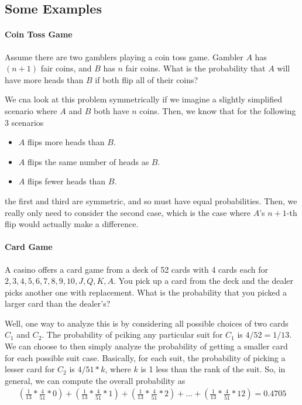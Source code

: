 \documentclass[10pt,a4paper]{article}
\begin{document}
\subsection*{Some Examples}

\paragraph*{Coin Toss Game} Assume there are two gamblers playing a coin toss game. Gambler $A$ has $(n+1)$ fair coins, and $B$ has $n$ fair coins. What is the probability that $A$ will have more heads than $B$ if both flip all of their coins?

We cna look at this problem symmetrically if we imagine a slightly simplified scenario where $A$ and $B$ both have $n$ coins. Then, we know that for the following 3 scenarios
\begin{itemize}
    \item $A$ flips more heads than $B$.
    \item $A$ flips the same number of heads as $B$.
    \item $A$ flips fewer heads than $B$. 
\end{itemize}
the first and third are symmetric, and so must have equal probabilities. Then, we really only need to consider the second case, which is the case where $A$'s $n+1$-th flip would actually make a difference.

\paragraph*{Card Game} A casino offers a card game from a deck of 52 cards with 4 cards each for $2,3,4,5,6,7,8,9,10,J,Q,K,A$. You pick up a card from the deck and the dealer picks another one with replacement. What is the probability that you picked a larger card than the dealer's?

Well, one way to analyze this is by considering all possible choices of two cards $C_1$ and $C_2$. The probability of pciking any particular suit for $C_1$ is $4/52 = 1/13$. We can choose to then simply analyze the probability of getting a smaller card for each possible suit case. Basically, for each suit, the probability of picking a lesser card for $C_2$ is $4/51 * k$, where $k$ is 1 less than the rank of the suit. So, in general, we can compute the overall probability as
\begin{align*}
    \left(\frac{1}{13}*\frac{4}{51}*0\right) + \left(\frac{1}{13}*\frac{4}{51}*1\right) + \left(\frac{1}{13}*\frac{4}{51}*2\right) + \dots + \left(\frac{1}{13}*\frac{4}{51}*12\right) = 0.4705
\end{align*}
\end{document}
